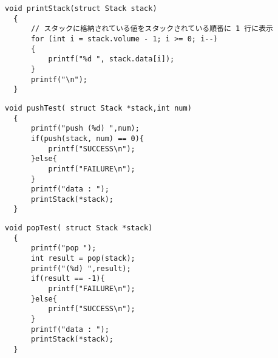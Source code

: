 \documentclass[a4paper,11pt]{jsarticle}
\begin{document}
\begin{lstlisting}[caption={printStack関数}, label={lst:printstack}]
  void printStack(struct Stack stack)
  {
      // スタックに格納されている値をスタックされている順番に 1 行に表示
      for (int i = stack.volume - 1; i >= 0; i--)
      {
          printf("%d ", stack.data[i]);
      }
      printf("\n");
  }
\end{lstlisting}
\begin{lstlisting}[caption={pushTest関数}, label={lst:pushtest}]
  void pushTest( struct Stack *stack,int num)
  {
      printf("push (%d) ",num);
      if(push(stack, num) == 0){
          printf("SUCCESS\n");
      }else{
          printf("FAILURE\n");
      }
      printf("data : ");
      printStack(*stack);
  }
\end{lstlisting}
\begin{lstlisting}[caption={popTest関数}, label={lst:poptest}]
  void popTest( struct Stack *stack)
  {
      printf("pop ");
      int result = pop(stack);
      printf("(%d) ",result);
      if(result == -1){
          printf("FAILURE\n");
      }else{
          printf("SUCCESS\n");
      }
      printf("data : ");
      printStack(*stack);
  }
\end{lstlisting}
\end{document}
